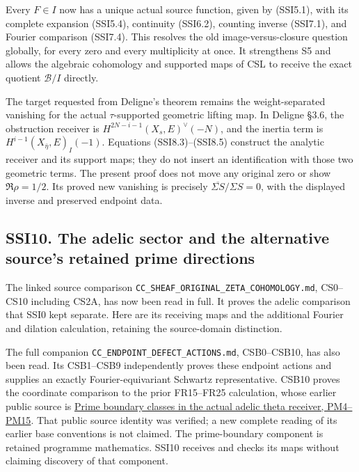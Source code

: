Every \(F\in I\) now has a unique actual source function, given by
(SSI5.1), with its complete expansion (SSI5.4), continuity (SSI6.2),
counting inverse (SSI7.1), and Fourier comparison (SSI7.4). This
resolves the old image-versus-closure question globally, for every zero
and every multiplicity at once. It strengthens S5 and allows the
algebraic cohomology and supported maps of CSL to receive the exact
quotient \(\mathcal B/I\) directly.

The target requested from Deligne's theorem remains the weight-separated
vanishing for the actual \(\tau\)-supported geometric lifting map. In
Deligne §3.6, the obstruction receiver is
\(H^{2N-i-1}(X_s,E)^\vee(-N)\), and the inertia term is
\(H^{i-1}(X_{\bar\eta},E)_I(-1)\). Equations (SSI8.3)--(SSI8.5)
construct the analytic receiver and its support maps; they do not insert
an identification with those two geometric terms. The present proof does
not move any original zero or show \(\Re\rho=1/2\). Its proved new
vanishing is precisely \(\overline{\Sigma S}/\Sigma S=0\), with the
displayed inverse and preserved endpoint data.

\subsection{SSI10. The adelic sector and the alternative source's
retained prime
directions}\label{ssi10.-the-adelic-sector-and-the-alternative-sources-retained-prime-directions}

The linked source comparison
\nolinkurl{CC_SHEAF_ORIGINAL_ZETA_COHOMOLOGY.md}, CS0--CS10 including
CS2A, has now been read in full. It proves the adelic comparison that
SSI0 kept separate. Here are its receiving maps and the additional
Fourier and dilation calculation, retaining the source-domain
distinction.

The full companion \nolinkurl{CC_ENDPOINT_DEFECT_ACTIONS.md},
CSB0--CSB10, has also been read. Its CSB1--CSB9 independently proves
these endpoint actions and supplies an exactly Fourier-equivariant
Schwartz representative. CSB10 proves the coordinate comparison to the
prior FR15--FR25 calculation, whose earlier public source is
\href{https://github.com/KokunoYumeto/zeta-function-research-reader/blob/44d03e48849934edf59f645cb5021b639ab31ac4/workbenches/splitzero-tandem/continuations/20260923-original-zeta-return/sources/21_prime_memory_and_actual_theta_receiver.tex}{Prime
boundary classes in the actual adelic theta receiver, PM4--PM15}. That
public source identity was verified; a new complete reading of its
earlier base conventions is not claimed. The prime-boundary component is
retained programme mathematics. SSI10 receives and checks its maps
without claiming discovery of that component.

